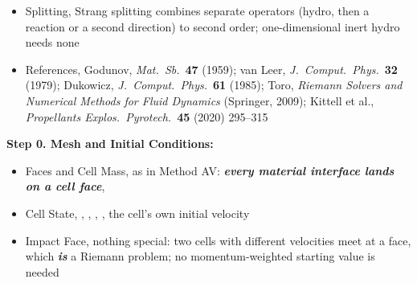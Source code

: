 \documentclass[11pt,addpoints]{exam}
\begin{document}
\begin{tcolorbox}[breakable]
\begin{itemize}
\item Splitting, \hspace{3mm} Strang splitting combines separate operators (hydro, then a reaction or a second direction) to second order; one-dimensional inert hydro needs none\vspace{.5em}
\item References, \hspace{3mm} Godunov, \emph{Mat.\ Sb.}\ \textbf{47} (1959); \hspace{1mm} van Leer, \emph{J.\ Comput.\ Phys.}\ \textbf{32} (1979); \hspace{1mm} Dukowicz, \emph{J.\ Comput.\ Phys.}\ \textbf{61} (1985); \hspace{1mm} Toro, \emph{Riemann Solvers and Numerical Methods for Fluid Dynamics} (Springer, 2009); \hspace{1mm} Kittell et al., \emph{Propellants Explos.\ Pyrotech.}\ \textbf{45} (2020) 295--315
\end{itemize}
\end{tcolorbox}

\clearpage

\begin{tcolorbox}[breakable]
\textbf{Step 0. Mesh and Initial Conditions:}\vspace{.5em}
\begin{itemize}
\item Faces and Cell Mass, \hspace{3mm} as in Method AV: \textbf{\emph{every material interface lands on a cell face}}, \hspace{2mm} \vspace{.5em}
\item Cell State, \hspace{3mm} , \hspace{2mm} , \hspace{2mm} , \hspace{2mm} , \hspace{2mm}  \hspace{7mm} the cell's own initial velocity\vspace{.5em}
\item Impact Face, \hspace{3mm} nothing special: two cells with different velocities meet at a face, which \textbf{\emph{is}} a Riemann problem; no momentum-weighted starting value is needed
\end{itemize}
\end{tcolorbox}
\end{document}
